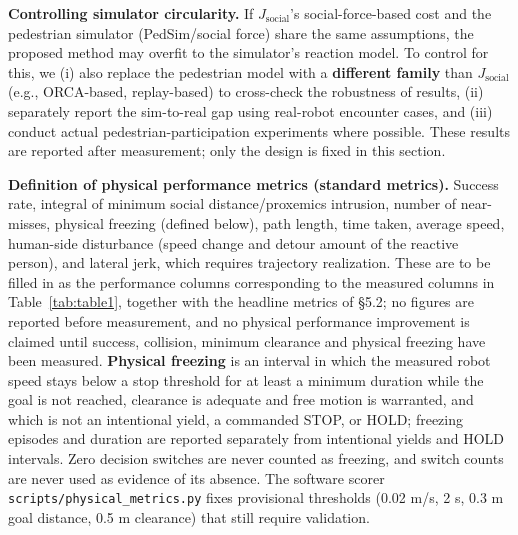 \documentclass[11pt]{article}
\newcommand{\code}[1]{\texttt{#1}}
\begin{document}
\textbf{Controlling simulator circularity.} If $J_{\text{social}}$'s social-force-based cost and the pedestrian simulator (PedSim/social force) share the same assumptions, the proposed method may overfit to the simulator's reaction model. To control for this, we (i) also replace the pedestrian model with a \textbf{different family} than $J_{\text{social}}$ (e.g., ORCA-based, replay-based) to cross-check the robustness of results, (ii) separately report the sim-to-real gap using real-robot encounter cases, and (iii) conduct actual pedestrian-participation experiments where possible. These results are reported after measurement; only the design is fixed in this section.

\textbf{Definition of physical performance metrics (standard metrics).} Success rate, integral of minimum social distance/proxemics intrusion, number of near-misses, physical freezing (defined below), path length, time taken, average speed, human-side disturbance (speed change and detour amount of the reactive person), and lateral jerk, which requires trajectory realization. These are to be filled in as the performance columns corresponding to the measured columns in Table~\ref{tab:table1}, together with the headline metrics of \S5.2; no figures are reported before measurement, and no physical performance improvement is claimed until success, collision, minimum clearance and physical freezing have been measured. \textbf{Physical freezing} is an interval in which the measured robot speed stays below a stop threshold for at least a minimum duration while the goal is not reached, clearance is adequate and free motion is warranted, and which is not an intentional yield, a commanded STOP, or HOLD; freezing episodes and duration are reported separately from intentional yields and HOLD intervals. Zero decision switches are never counted as freezing, and switch counts are never used as evidence of its absence. The software scorer \code{scripts/physical\_metrics.py} fixes provisional thresholds (0.02 m/s, 2 s, 0.3 m goal distance, 0.5 m clearance) that still require validation.
\end{document}
